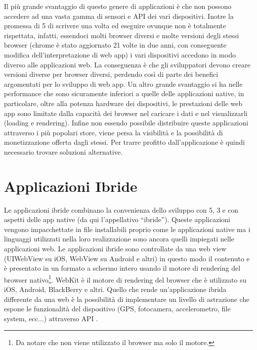         Il più grande svantaggio di questo genere di applicazioni è che non
        possono accedere ad una vasta gamma di sensori e API dei vari
        dispositivi. Inotre la promessa di \html{}5 di scrivere una volta ed eseguire
        ovunque non è totalmente rispettata, infatti, essendoci molti \mbox{browser}
        diversi e molte versioni degli stessi \mbox{browser} (chrome è stato aggiornato
        21 volte in due anni, con conseguente modifica dell'interpretazione di
        web app\citep{White:Native-vs-Html}) i vari dispositivi accedono in modo
        diverso alle applicazioni web. La conseguenza è che gli sviluppatori
        devono creare versioni diverse per \mbox{browser} diversi, perdendo così di
        parte dei benefici argomentati per lo sviluppo di web app. Un
        altro grande svantaggio si ha nelle performance che sono sicuramente
        inferiori a quelle delle applicazioni native, in particolare, oltre
        alla potenza hardware dei dispositivi, le prestazioni delle web app
        sono limitate dalla capacità dei \mbox{browser} nel
        caricare i dati e nel visualizzarli (load\-ing e ren\-der\-ing). Infine non
        essendo possibile distribuire queste applicazioni attraverso i più
        popolari \mbox{store}, viene persa la visibilità e la possibilità di
        monetizzazione offerta dagli stessi. Per trarre profitto
        dall'applicazione è quindi necessario trovare soluzioni alternative.

    \section{Applicazioni Ibride}
        Le applicazioni ibride combinano la convenienza dello sviluppo con
        \html{}5,
        \css{}3 e \js{} con aspetti delle app native (da qui l'appellativo
        ``ibride''). Queste applicazioni vengono impacchettate in file
        installabili proprio come le applicazioni native ma i linguaggi
        utilizzati nella loro realizzazione sono ancora quelli impiegati nelle
        applicazioni web. Le applicazioni ibride sono controllate da una web
        view (UIWebView su iOS, WebView su Android e altri) in questo modo il
        contenuto \js{} e \html{} è  presentato in un formato a schermo
        intero usando il motore di ren\-der\-ing del \mbox{browser} nativo\footnote{Da
        notare che non viene utilizzato il \mbox{browser} ma solo il motore.}. WebKit è
        il motore di ren\-der\-ing del \mbox{browser} che è utilizzato su iOS, Android,
        BlackBerry e altri. Quello che rende un'applicazione ibrida differente
        da una web è la possibilità di implementare un livello di astrazione
        che espone le funzionalità del dispositivo (GPS, fotocamera,
        accelerometro, file sys\-tem, ecc...) attraverso API \js{}.

